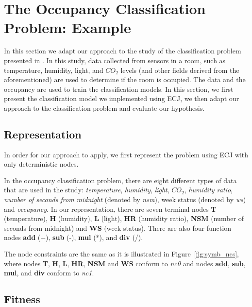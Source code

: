 \section{The Occupancy Classification Problem: Example}

In this section we adapt our approach to the study of the classification problem presented in \cite{Candanedo201628}. In this study, data collected from sensors in a room, such as temperature, humidity, light, and $CO_2$ levels (and other fields derived from the aforementioned) are used to determine if the room is occupied. The data and the occupancy are used to train the classification models. In this section, we first present the classification model we implemented using ECJ, we then adapt our approach to the classification problem and evaluate our hypothesis.

\subsection{Representation}
In order for our approach to apply, we first represent the problem using ECJ with only deterministic nodes. 

In the occupancy classification problem, there are eight different types of data that are used in the study: \emph{temperature}, \emph{humidity}, \emph{light}, $CO_2$, \emph{humidity ratio}, \emph{number of seconds from midnight} (denoted by \emph{nsm}), week status (denoted by \emph{ws}) and \emph{occupancy}. In our representation, there are seven terminal nodes \textbf{T} (temperature), \textbf{H} (humidity), \textbf{L} (light), \textbf{HR} (humidity ratio), \textbf{NSM} (number of seconds from midnight) and \textbf{WS} (week status). There are also four function nodes \textbf{add} (+), \textbf{sub} (-), \textbf{mul} (*), and \textbf{div} (/). 

The node constraints are the same as it is illustrated in Figure~\ref{fig:symb_ncs}, where nodes \textbf{T}, \textbf{H}, \textbf{L}, \textbf{HR}, \textbf{NSM} and \textbf{WS} conform to \emph{nc0} and nodes \textbf{add}, \textbf{sub}, \textbf{mul}, and \textbf{div} conform to \emph{nc1}.

\subsection{Fitness}

